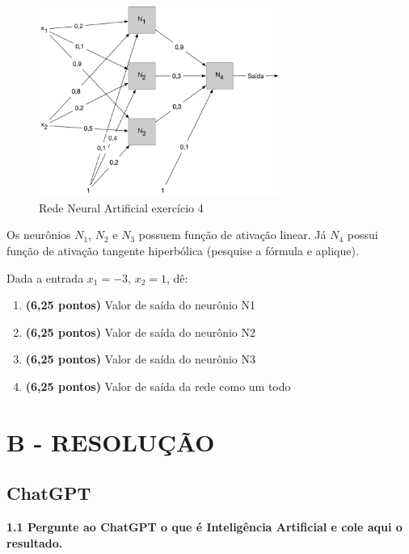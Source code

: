     \begin{figure}[H]
        \centering
        \includegraphics[width=0.7\textwidth]{apendices/fig/1_IAA001_3.png} 
        \caption{Rede Neural Artificial exercício 4}
    \end{figure}

    Os neurônios $N_1$, $N_2$ e $N_3$ possuem função de ativação linear. Já $N_4$ possui função de ativação tangente hiperbólica (pesquise a fórmula e aplique).

    Dada a entrada $x_1 = -3$, $x_2 = 1$, dê:
    \begin{enumerate}[label=\alph*)]
        \item \textbf{(6,25 pontos)} Valor de saída do neurônio N1
        \item \textbf{(6,25 pontos)} Valor de saída do neurônio N2
        \item \textbf{(6,25 pontos)} Valor de saída do neurônio N3
        \item \textbf{(6,25 pontos)} Valor de saída da rede como um todo
    \end{enumerate}

\section*{\textbf{B - RESOLUÇÃO}}
\setcounter{subsection}{0}

\subsection{ChatGPT}
\begin{adjustwidth}{1em}{}
\textbf{1.1 Pergunte ao ChatGPT o que é Inteligência Artificial e cole aqui o resultado.}
\end{adjustwidth}

